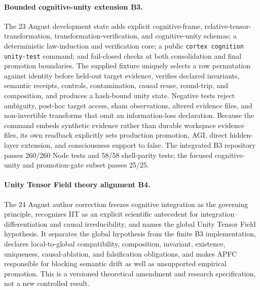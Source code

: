 \documentclass[10pt,twocolumn]{article}
\theoremstyle{definition}
\theoremstyle{plain}
\theoremstyle{remark}
\newcommand{\file}[1]{\nolinkurl{#1}}
\newcommand{\unity}{\textsf{B3}}
\newcommand{\unitytheory}{\textsf{B4}}
\begin{document}
\paragraph{Bounded cognitive-unity extension \unity.}
The 23 August development state adds explicit cognitive-frame, relative-tensor-transformation, transformation-verification, and cognitive-unity schemas; a deterministic law-induction and verification core; a public \file{cortex cognition unity-test} command; and fail-closed checks at both consolidation and final promotion boundaries.  The supplied fixture uniquely selects a row permutation against identity before held-out target evidence, verifies declared invariants, semantic receipts, controls, contamination, causal reuse, round-trip, and composition, and produces a hash-bound unity state.  Negative tests reject ambiguity, post-hoc target access, sham observations, altered evidence files, and non-invertible transforms that omit an information-loss declaration.  Because the command embeds synthetic evidence rather than durable workspace evidence files, its own readback explicitly sets production promotion, AGI, direct hidden-layer extension, and consciousness support to false.  The integrated B3 repository passes 260/260 Node tests and 58/58 shell-parity tests; the focused cognitive-unity and promotion-gate subset passes 25/25.

\paragraph{Unity Tensor Field theory alignment \unitytheory.}
The 24 August author correction freezes cognitive integration as the governing principle, recognizes IIT as an explicit scientific antecedent for integration--differentiation and causal irreducibility, and names the global Unity Tensor Field hypothesis.  It separates the global hypothesis from the finite B3 implementation, declares local-to-global compatibility, composition, invariant, existence, uniqueness, causal-ablation, and falsification obligations, and makes APFC responsible for blocking semantic drift as well as unsupported empirical promotion.  This is a versioned theoretical amendment and research specification, not a new controlled result.
\end{document}
